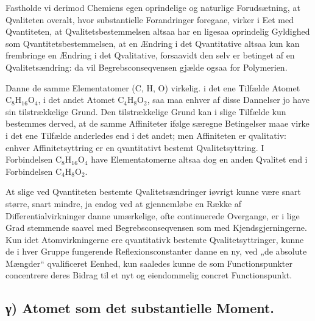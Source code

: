 \documentclass[12pt,a4paper]{book}
\begin{document}
Fastholde vi derimod Chemiens egen oprindelige og
naturlige Forudsætning, at Qvaliteten overalt, hvor substantielle
Forandringer foregaae, virker i Eet med Qvantiteten, at
Qvalitetsbestemmelsen altsaa har en ligesaa oprindelig
Gyldighed som Qvantitetsbestemmelsen, at en Ændring i det
Qvantitative altsaa kun kan frembringe en Ændring i det
Qvalitative, forsaavidt den selv er betinget af en
Qvalitetsændring: da vil Begrebsconseqvensen gjælde ogsaa for
Polymerien.

Danne de samme Elementatomer
($\mathrm{C}$, $\mathrm{H}$, $\mathrm{O}$) virkelig. i
det ene Tilfælde Atomet
$\mathrm{C}_8\mathrm{H}_{16}\mathrm{O}_4$, i det andet Atomet
$\mathrm{C}_4\mathrm{H}_8\mathrm{O}_2$,
saa maa enhver af disse Dannelser jo have sin tilstrækkelige
Grund. Den tilstrækkelige Grund kan i slige Tilfælde kun
bestemmes derved, at de samme Affiniteter ifølge særegne
Betingelser maae virke i det ene Tilfælde anderledes end i det
andet; men Affiniteten er qvalitativ: enhver Affinitetsyttring
er en qvantitativt bestemt Qvalitetsyttring. I Forbindelsen
$\mathrm{C}_8\mathrm{H}_{16}\mathrm{O}_4$ have Elementatomerne
altsaa dog en anden Qvalitet
end i Forbindelsen $\mathrm{C}_4\mathrm{H}_8\mathrm{O}_2$.

At slige ved Qvantiteten bestemte Qvalitetsændringer
iøvrigt kunne være snart større, snart mindre, ja endog ved
at gjennemløbe en Række af Differentialvirkninger danne
umærkelige, ofte continuerede Overgange, er i lige Grad
stemmende saavel med Begrebsconseqvensen som med
Kjendsgjerningerne. Kun idet Atomvirkningerne ere qvantitativk
bestemte Qvalitetsyttringer, kunne de i hver Gruppe fungerende
Reflexionsconstanter danne en ny, ved „de absolute
Mængder“ qvalificeret Eenhed, kun saaledes kunne de som
Functionspunkter concentrere deres Bidrag til et nyt og
eiendommelig concret Functionspunkt.

\subsection*{γ) Atomet som det substantielle Moment.}
\end{document}
